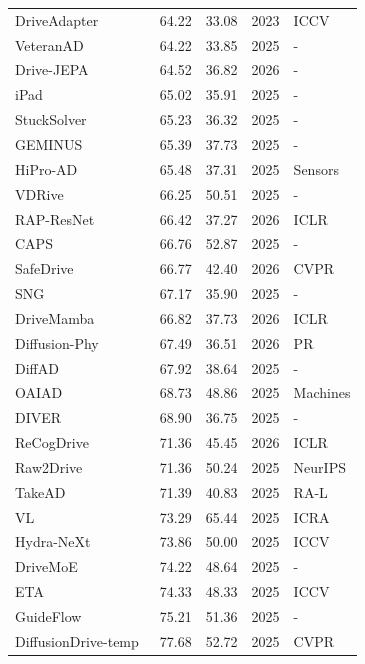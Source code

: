 \documentclass[10pt,twocolumn,letterpaper]{article}
\begin{document}
\begin{table}[t]
\begin{tabular}{l|ll|ll}
DriveAdapter~\cite{Jia2023ICCV} & 64.22 & 33.08 & 2023 & ICCV \\
VeteranAD~\cite{Zhang2025ARXIVb} & 64.22 & 33.85 & 2025 & - \\
Drive-JEPA~\cite{Wang2026ARXIV} & 64.52 & 36.82 & 2026 & - \\
iPad~\cite{Guo2025ARXIVb} & 65.02 & 35.91 & 2025 & - \\
StuckSolver~\cite{Bao2025ARXIV} & 65.23 & 36.32 & 2025 & - \\
GEMINUS~\cite{Wan2025ARXIV} & 65.39 & 37.73 & 2025 & - \\
HiPro-AD~\cite{Chen2025SENSORS} & 65.48 & 37.31 & 2025 & Sensors \\
VDRive~\cite{Guo2025ARXIV} & 66.25 & 50.51 & 2025 & - \\
RAP-ResNet~\cite{Feng2026ICLR} & 66.42 & 37.27 & 2026 & ICLR \\
CAPS~\cite{Mirkhani2025ARXIV} & 66.76 & 52.87 & 2025 & - \\
SafeDrive~\cite{Kim2026CVPR} & 66.77 & 42.40 & 2026 & CVPR \\
SNG~\cite{Hua2025Online} & 67.17 & 35.90 & 2025 & - \\
DriveMamba~\cite{Su2026ICLR} & 66.82 & 37.73 & 2026 & ICLR \\
Diffusion-Phy~\cite{Hu2026PR} & 67.49 & 36.51 & 2026 & PR \\
DiffAD~\cite{Wang2025ARXIVb} & 67.92 & 38.64 & 2025 & - \\
OAIAD~\cite{Yin2025Machines} & 68.73 & 48.86 & 2025 & Machines \\
DIVER~\cite{Song2025ARXIV} & 68.90 & 36.75 & 2025 & - \\ 
ReCogDrive~\cite{Li2026ICLR} & 71.36 & 45.45 & 2026 & ICLR \\
Raw2Drive~\cite{Yang2025NEURIPS} & 71.36 & 50.24 & 2025 & NeurIPS \\
TakeAD~\cite{Liu2025RAL} & 71.39 & 40.83 & 2025 & RA-L \\
VL~\cite{Arasteh2025ICRA} & 73.29 & 65.44 & 2025 & ICRA \\
Hydra-NeXt~\cite{Li2025ICCVb} & 73.86 & 50.00 & 2025 & ICCV \\
DriveMoE~\cite{Yang2025ARXIV} & 74.22 & 48.64 & 2025 & - \\
ETA~\cite{Hamdan2025ICCV} & 74.33 & 48.33 & 2025 & ICCV \\
GuideFlow~\cite{Liu2025ARXIVe} & 75.21 & 51.36 & 2025 & - \\
DiffusionDrive-temp~\cite{Liao2025CVPR} & 77.68 & 52.72 & 2025 & CVPR \\

\end{tabular}
\end{table}
\end{document}
